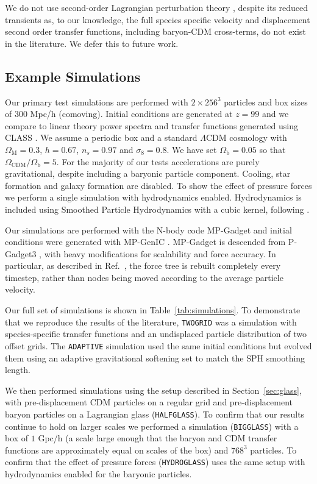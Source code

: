 \documentclass[a4paper,11pt]{article}
\begin{document}
We do not use second-order Lagrangian perturbation theory \cite{Scoccimarro:1998}, despite its reduced transients as, to our knowledge, the full species specific velocity and displacement second order transfer functions, including baryon-CDM cross-terms, do not exist in the literature. We defer this to future work.

\subsection{Example Simulations}
\label{sec:simulations}

Our primary test simulations are performed with $2\times 256^3$ particles and box sizes of $300$ Mpc/h (comoving). Initial conditions are generated at $z=99$ and we compare to linear theory power spectra and transfer functions generated using CLASS \cite{CLASS}. We assume a periodic box and a standard $\Lambda$CDM cosmology with $\Omega_\mathrm{M} = 0.3$, $h = 0.67$, $n_s = 0.97$ and $\sigma_8 = 0.8$. We have set $\Omega_\mathrm{b} = 0.05$ so that $\Omega_{\mathrm{CDM}}/ \Omega_\mathrm{b} = 5$. For the majority of our tests accelerations are purely gravitational, despite including a baryonic particle component. Cooling, star formation and galaxy formation are disabled. To show the effect of pressure forces we perform a single simulation with hydrodynamics enabled. Hydrodynamics is included using Smoothed Particle Hydrodynamics with a cubic kernel, following \cite{Springel:2005}.

Our simulations are performed with the N-body code MP-Gadget and initial conditions were generated with MP-GenIC \cite{yu_feng_2018_1451799}. MP-Gadget is descended from P-Gadget3 \cite{Springel:2005}, with heavy modifications for scalability and force accuracy. In particular, as described in Ref.~\cite{Bird:2018}, the force tree is rebuilt completely every timestep, rather than nodes being moved according to the average particle velocity.

Our full set of simulations is shown in Table~\ref{tab:simulations}. To demonstrate that we reproduce the results of the literature, \texttt{TWOGRID} was a simulation with species-specific transfer functions and an undisplaced particle distribution of two offset grids. The \texttt{ADAPTIVE} simulation used the same initial conditions but evolved them using an adaptive gravitational softening set to match the SPH smoothing length.

We then performed simulations using the setup described in Section~\ref{sec:glass}, with pre-displacement CDM particles on a regular grid and pre-displacement baryon particles on a Lagrangian glass (\texttt{HALFGLASS}). To confirm that our results continue to hold on larger scales we performed a simulation (\texttt{BIGGLASS}) with a box of $1$ Gpc/h (a scale large enough that the baryon and CDM transfer functions are approximately equal on scales of the box) and $768^3$ particles. To confirm that the effect of pressure forces (\texttt{HYDROGLASS}) uses the same setup with hydrodynamics enabled for the baryonic particles.
\end{document}
